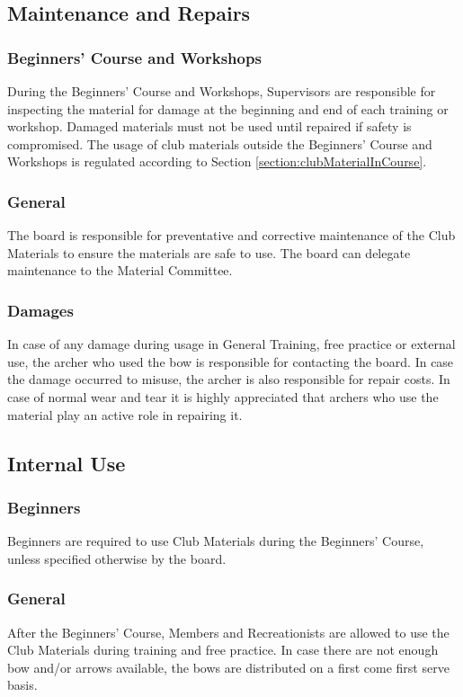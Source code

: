 \documentclass[a4paper]{article}
\begin{document}
\subsection{Maintenance and Repairs}
\subsubsection{Beginners' Course and Workshops}
During the Beginners' Course and Workshops, Supervisors are responsible for inspecting the material for damage at the beginning and end of each training or workshop. Damaged materials must not be used until repaired if safety is compromised. The usage of club materials outside the Beginners' Course and Workshops is regulated according to Section \ref{section:clubMaterialInCourse}.

\subsubsection{General}
The board is responsible for preventative and corrective maintenance of the Club Materials to ensure the materials are safe to use. The board can delegate maintenance to the Material Committee. 

\subsubsection{Damages}
In case of any damage during usage in General Training, free practice or external use, the archer who used the bow is responsible for contacting the board. In case the damage occurred to misuse, the archer is also responsible for repair costs. In case of normal wear and tear it is highly appreciated that archers who use the material play an active role in repairing it.

\subsection{Internal Use}
\subsubsection{Beginners}
Beginners are required to use Club Materials during the Beginners' Course, unless specified otherwise by the board.

\subsubsection{General}
After the Beginners' Course, Members and Recreationists are allowed to use the Club Materials during training and free practice. In case there are not enough bow and/or arrows available, the bows are distributed on a first come first serve basis.
\end{document}
